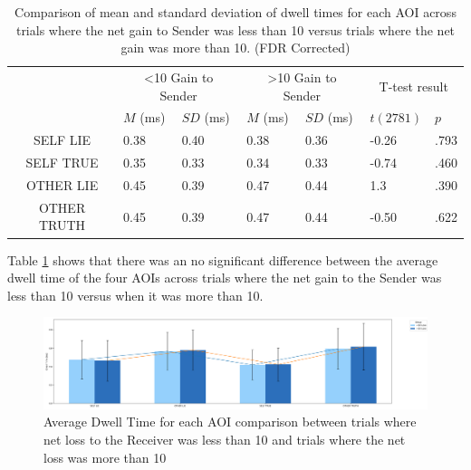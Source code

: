 \documentclass[man, floatsintext]{apa7}
\begin{document}
\begin{table}[H]
	\centering
	\begin{tabular}{|c|p{1.5cm}|p{2cm}|p{1.5cm}|p{2cm}|p{2cm}|p{1.5cm}|}
		\hline
		\multirow{2}{*}{} & \multicolumn{2}{c|}{<10 Gain to Sender} & \multicolumn{2}{c|}{>10 Gain to Sender} & \multicolumn{2}{c|}{T-test result} \\ \cline{2-7}
		& $M$ (ms) &$SD$ (ms) & $M$ (ms) & $SD$ (ms) & $t(2781)$ & $p$ \\ \hline
		SELF LIE& 0.38 & 0.40 & 0.38 & 0.36 & -0.26 & .793  \\ \hline
		SELF TRUE & 0.35 & 0.33 & 0.34 & 0.33 & -0.74 & .460  \\ \hline
		OTHER LIE & 0.45 & 0.39 & 0.47 & 0.44 & 1.3 & .390 \\ \hline
		OTHER TRUTH & 0.45 & 0.39 & 0.47 & 0.44& -0.50 & .622 \\ \hline
	\end{tabular}
	\vspace{0.3cm}
	\caption{Comparison of mean and standard deviation of dwell times for each AOI across trials where the net gain to Sender was less than 10 versus trials where the net gain was more than 10. (FDR Corrected)}
	\label{tab:NetGainDwell}
\end{table}

Table \ref{tab:NetGainDwell} shows that there was an no significant difference between the average dwell time of the four AOIs across trials where the net gain to the Sender was less than 10 versus when it was more than 10.

\begin{figure}[H]
	\includegraphics[width=\linewidth]{../plots/RESPONSE/AvgDwellPerLossPlot.png}
	\caption{Average Dwell Time for each AOI comparison between trials where net loss to the Receiver was less than 10 and trials where the net loss was more than 10}
	\label{fig:AvgDwellPerLoss}
\end{figure}
\end{document}
